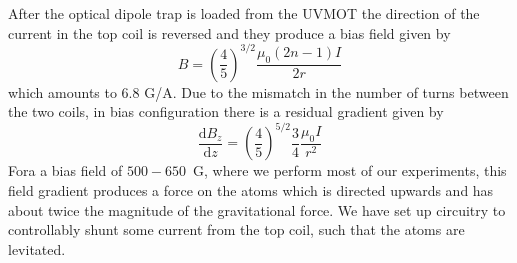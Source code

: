 After the optical dipole trap is loaded from the UVMOT the direction of the
current in the top coil is reversed and they produce a bias field given by 
\begin{equation}
 B = \left( \frac{4}{5} \right) ^{3/2} \frac{\mu_{0} (2n-1) I }{2r}  
\end{equation}
 which amounts to  6.8 G/A.   Due to the mismatch in the number of turns
between the two coils, in bias configuration there is a residual gradient given
by 
\begin{equation}
 \frac{ \mathrm{d}B_{z}}{ \mathrm{d}z}= \left(
\frac{4}{5} \right) ^{5/2} \frac{3}{4} \frac{\mu_{0} I } { r^{2} } 
\end{equation}
Fora a bias field of $500-650$~G, where we perform most of our experiments,
this field gradient produces a force on the atoms which is directed upwards and
has about twice the magnitude of the gravitational force.   We have set up
circuitry to controllably shunt some current from the top coil, such that the
atoms are levitated.  


